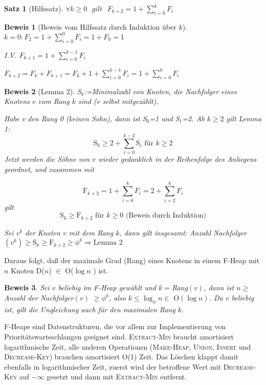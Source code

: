 \documentclass[ngerman,draft,parskip=half*,twoside]{scrreprt}
\theoremstyle{break}
\newtheorem{beweis}{Beweis}
\newtheorem{satz}{Satz}
\begin{document}
\begin{satz}[Hilfssatz]
$\forall k \geq 0 \mbox{ }gilt \mbox{ } F_{k+2}=1+\sum_{i=0}^k F_i$
\end{satz}

\begin{beweis}[Beweis vom Hilfssatz durch Induktion über $k$]
$k=0 : F_2=1+\sum_{i=0}^0 F_i = 1+ F_0 =1$

\noindent I.V. $F_{k+1}=1+\sum_{i=0}^{k-1} F_i$

\noindent $F_{k+2}=F_{k}+F_{k+1}=F_k + 1 + \sum_{i=0}^{k-1} F_i = 1+\sum_{i=0}^k F_i$
\end{beweis}

\begin{beweis}[Lemma 2]
S$_k$:=Minimalzahl von Knoten, die Nachfolger eines Knotens $v$ vom Rang $k$ sind ($v$ selbst mitgezählt).

\noindent Habe v den Rang 0 (keinen Sohn), dann ist S$_0$=1 und S$_1$=2. Ab $k \geq 2$ gilt Lemma 1:
\[\mbox{S}_k \geq 2 + \sum_{i=0}^{k-2} \mbox{S}_i \mbox{ für }k \geq 2\]
Jetzt werden die Söhne von $v$ wieder gedanklich in der Reihenfolge des Anliegens geordnet, und zusammen mit

\[\mbox{F}_{k+2}=1+\sum_{i=0}^k F_i=2+\sum_{i=2}^k F_i\] gilt \[\mbox{S}_k \geq \mbox{F}_{k+2} \mbox{ für } k \geq 0
\mbox{ (Beweis durch Induktion)}\]

Sei $v^k$ der Knoten $v$ mit dem Rang $k$, dann gilt insgesamt: Anzahl Nachfolger$(v^k) \geq \mbox{S}_k \geq
\mbox{F}_{k+2} \geq {\phi}^k \Rightarrow \mbox{Lemma 2}$ 
\end{beweis}
Daraus folgt, daß der maximale Grad (Rang) eines Knotens in einem F-Heap mit $n$ Knoten D($n$) $\in$ O($\log n$ ) ist.

\begin{beweis}
Sei $v$ beliebig im F-Heap gewählt und $k=$Rang$(v)$, dann ist $n \geq$Anzahl der Nachfolger$(v)$ $\geq {\phi}^k$, also
$k \leq \log_{\phi} n \in \mbox{ O}(\log n)$. Da $v$ beliebig ist, gilt die Ungleichung auch für den maximalen Rang
$k$. 
\end{beweis}
F-Heaps sind Datenstrukturen, die vor allem zur Implementierung von Prioritätswarteschlangen geeignet sind.
\textsc{Extract-Min} braucht amortisiert logarithmische Zeit, alle anderen Operationen (\textsc{Make-Heap},
\textsc{Union}, \textsc{Insert} und \textsc{Decrease-Key}) brauchen amortisiert O(1) Zeit. Das Löschen klappt damit
ebenfalls in logarithmischer Zeit, zuerst wird der betroffene Wert mit \textsc{Decrease-Key} auf $- \infty$ gesetzt
und dann mit \textsc{Extract-Min} entfernt.
\end{document}
